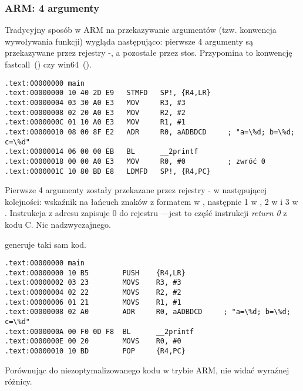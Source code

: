 \subsubsection{ARM: 4 argumenty}

Tradycyjny sposób w ARM na przekazywanie argumentów (tzw. konwencja wywoływania funkcji) wygląda następująco:
pierwsze 4 argumenty są przekazywane przez rejestry -, a pozostałe przez stos.
Przypomina to konwencję fastcall~() czy win64~().


\mysubparagraph{\NonOptimizingKeilVI (\ARMMode)}

\begin{lstlisting}[caption=\NonOptimizingKeilVI (\ARMMode),style=customasmARM]
.text:00000000 main
.text:00000000 10 40 2D E9   STMFD   SP!, {R4,LR}
.text:00000004 03 30 A0 E3   MOV     R3, #3
.text:00000008 02 20 A0 E3   MOV     R2, #2
.text:0000000C 01 10 A0 E3   MOV     R1, #1
.text:00000010 08 00 8F E2   ADR     R0, aADBDCD     ; "a=\%d; b=\%d; c=\%d"
.text:00000014 06 00 00 EB   BL      __2printf
.text:00000018 00 00 A0 E3   MOV     R0, #0          ; zwróć 0
.text:0000001C 10 80 BD E8   LDMFD   SP!, {R4,PC}
\end{lstlisting}

Pierwsze 4 argumenty zostały przekazane przez rejestry - w następującej kolejności:
wskaźnik na łańcuch znaków z formatem w , następnie 1 w , 2 w  i 3 w .
Instrukcja z adresu  zapisuje 0 do rejestru ---jest to część instrukcji \emph{return 0} z kodu C.
Nic nadzwyczajnego.

\OptimizingKeilVI generuje taki sam kod.

\mysubparagraph{\OptimizingKeilVI (\ThumbMode)}

\begin{lstlisting}[caption=\OptimizingKeilVI (\ThumbMode),style=customasmARM]
.text:00000000 main
.text:00000000 10 B5        PUSH    {R4,LR}
.text:00000002 03 23        MOVS    R3, #3
.text:00000004 02 22        MOVS    R2, #2
.text:00000006 01 21        MOVS    R1, #1
.text:00000008 02 A0        ADR     R0, aADBDCD     ; "a=\%d; b=\%d; c=\%d"
.text:0000000A 00 F0 0D F8  BL      __2printf
.text:0000000E 00 20        MOVS    R0, #0
.text:00000010 10 BD        POP     {R4,PC}
\end{lstlisting}

Porównując do niezoptymalizowanego kodu w trybie ARM, nie widać wyraźnej różnicy.

